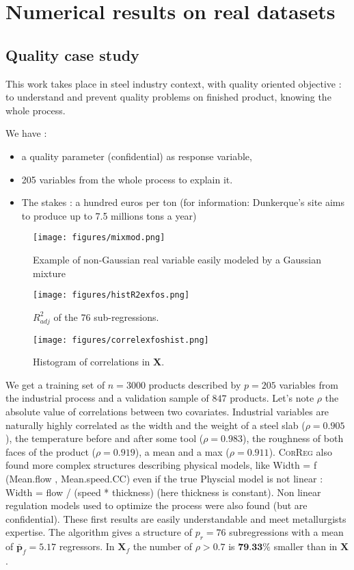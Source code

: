 \documentclass[11pt,a4paper]{article}
\begin{document}
	\clearpage	
\section{Numerical results on real datasets} \label{sectionrealcase}
\subsection{Quality case study} \label{sectionexfos}
This work takes place in steel industry context, with quality oriented objective : to understand and prevent quality problems on finished product, knowing the whole process. 
		
We have :
		\begin{itemize}
			\item a quality parameter (confidential) as response variable,
			\item 205 variables from the whole process to explain it.
			\item The stakes : a hundred euros per ton (for information: Dunkerque's  site aims to produce up to 7.5 millions tons a year)
		\end{itemize}
		
\begin{figure}[h!]
	\begin{minipage}[l]{.30\linewidth}
			\texttt{[image: figures/mixmod.png]} 
			\caption{Example of non-Gaussian real variable easily modeled by a Gaussian mixture}\label{graphMixmod}
	\end{minipage} \hfill
	\begin{minipage}[c]{.30\linewidth}
			\texttt{[image: figures/histR2exfos.png]} 
			\caption{$R^2_{adj}$ of the 76 sub-regressions.}
	\end{minipage} \hfill
   \begin{minipage}[r]{.30\linewidth}
			\texttt{[image: figures/correlexfoshist.png]} 
			\caption{Histogram of correlations in $\boldsymbol{X}$.} \label{compareMSEexfos}
   \end{minipage}
\end{figure}   			
	We get a training set of $n=3 000$ products described by $p=205$ variables from the industrial process and a validation sample of $847$ products.
	Let's note $\rho$ the absolute value of correlations between two covariates. Industrial variables are naturally highly correlated as the width and the weight of a steel slab ($\rho=0.905$), the temperature before and after some tool ($\rho=0.983$), the  roughness of both faces of the product ($\rho= 0.919$), a mean and a max ($\rho=0.911$). \textsc{CorReg} also found more complex structures describing physical models, like   Width = f (Mean.flow , Mean.speed.CC) even if the true Physcial model is not linear : Width = flow / (speed * thickness) (here thickness is constant). Non linear regulation models used to optimize the process were also found (but are confidential). These first results are easily understandable and meet metallurgists expertise.  
			The algorithm gives a structure of $p_r=76$ subregressions with a mean of $\bar{\boldsymbol{p}}_f=5.17$ regressors. In $\boldsymbol{X}_f$ the number of $\rho>0.7$ is $\textbf{79.33\%}$ smaller than in $\boldsymbol{X}$.		
	
\end{document}
